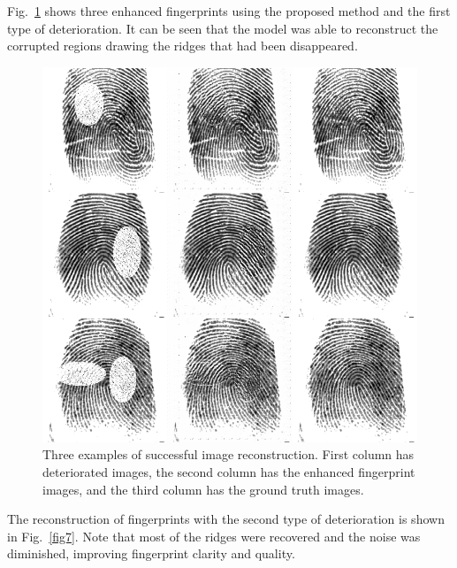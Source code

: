 \documentclass[a4paper,fleqn]{cas-dc}
\begin{document}
Fig.~\ref{fig6} shows three enhanced fingerprints using the proposed method and the first type of deterioration. It can be seen that the model was able to reconstruct the corrupted regions drawing the ridges that had been disappeared.
\begin{figure}[!ht]
\centerline{\includegraphics[scale=0.28]{figs/recons_1.png}}
\caption{Three examples of successful image reconstruction. First column has deteriorated images, the second column has the enhanced fingerprint images, and the third column has the ground truth images.}
\label{fig6}
\end{figure}
The reconstruction of fingerprints with the second type of deterioration is shown in Fig.~\ref{fig7}. Note that most of the ridges were recovered and the noise was diminished, improving fingerprint clarity and quality.
\end{document}
